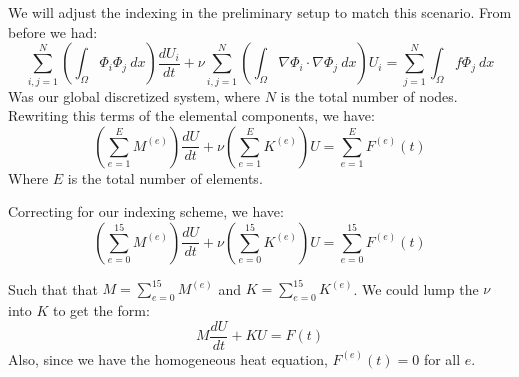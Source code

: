 \documentclass[12pt]{article}
\begin{document}
We will adjust the indexing in the preliminary setup to match this scenario. From before we had:
\[\sum_{i,j=1}^{N} \left( \int_{\Omega} \Phi_i \Phi_j \ dx \right) \frac{dU_i}{dt} + \nu \sum_{i,j=1}^{N}  \left( \int_{\Omega} \nabla \Phi_i \cdot \nabla \Phi_j \ dx \right) U_i = \sum_{j=1}^{N}\int_{\Omega} f \Phi_j \ dx\] 
Was our global discretized system, where $N$ is the total number of nodes. Rewriting this terms of the elemental components, we have:
\[\left(\sum_{e=1}^{E} M^{(e)} \right) \frac{dU}{dt} + \nu \left(\sum_{e=1}^{E} K^{(e)}\right) U = \sum_{e=1}^{E} F^{(e)}(t)\]
Where $E$ is the total number of elements.

Correcting for our indexing scheme, we have:
\[\left(\sum_{e=0}^{15} M^{(e)} \right) \frac{dU}{dt} + \nu \left(\sum_{e=0}^{15} K^{(e)}\right) U = \sum_{e=0}^{15} F^{(e)}(t)\]

Such that that $M = \sum_{e=0}^{15} M^{(e)}$ and $K = \sum_{e=0}^{15} K^{(e)}$. We could lump the $\nu$ into $K$ to get the form:
\[M \frac{dU}{dt} + K U = F(t)\]
Also, since we have the homogeneous heat equation, $F^{(e)}(t) = 0$ for all $e$.
\end{document}
